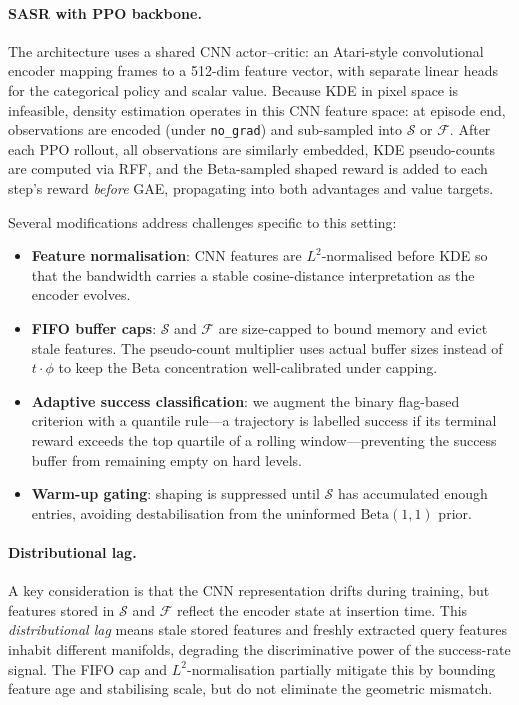\documentclass{article}
\begin{document}
\paragraph{SASR with PPO backbone.}
The architecture uses a shared CNN actor--critic: an Atari-style convolutional encoder mapping frames to a 512-dim feature vector, with separate linear heads for the categorical policy and scalar value. Because KDE in pixel space is infeasible, density estimation operates in this CNN feature space: at episode end, observations are encoded (under \texttt{no\_grad}) and sub-sampled into $\mathcal{S}$ or $\mathcal{F}$. After each PPO rollout, all observations are similarly embedded, KDE pseudo-counts are computed via RFF, and the Beta-sampled shaped reward is added to each step's reward \emph{before} GAE, propagating into both advantages and value targets.

Several modifications address challenges specific to this setting:
\begin{itemize}
    \item \textbf{Feature normalisation}: CNN features are $L^2$-normalised before KDE so that the bandwidth carries a stable cosine-distance interpretation as the encoder evolves.
    \item \textbf{FIFO buffer caps}: $\mathcal{S}$ and $\mathcal{F}$ are size-capped to bound memory and evict stale features. The pseudo-count multiplier uses actual buffer sizes instead of $t \cdot \phi$ to keep the Beta concentration well-calibrated under capping.
    \item \textbf{Adaptive success classification}: we augment the binary flag-based criterion with a quantile rule---a trajectory is labelled success if its terminal reward exceeds the top quartile of a rolling window---preventing the success buffer from remaining empty on hard levels.
    \item \textbf{Warm-up gating}: shaping is suppressed until $\mathcal{S}$ has accumulated enough entries, avoiding destabilisation from the uninformed $\mathrm{Beta}(1,1)$ prior.
\end{itemize}

\paragraph{Distributional lag.}
A key consideration is that the CNN representation drifts during training, but features stored in $\mathcal{S}$ and $\mathcal{F}$ reflect the encoder state at insertion time. This \emph{distributional lag} means stale stored features and freshly extracted query features inhabit different manifolds, degrading the discriminative power of the success-rate signal. The FIFO cap and $L^2$-normalisation partially mitigate this by bounding feature age and stabilising scale, but do not eliminate the geometric mismatch.
\end{document}
